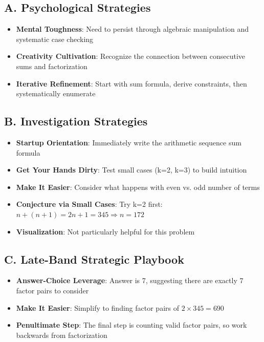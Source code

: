 \documentclass[11pt]{article}
\begin{document}
\begin{strategicbox}
\subsection*{A. Psychological Strategies}
\begin{itemize}[leftmargin=*]
    \item \textbf{Mental Toughness}: Need to persist through algebraic manipulation and systematic case checking
    \item \textbf{Creativity Cultivation}: Recognize the connection between consecutive sums and factorization
    \item \textbf{Iterative Refinement}: Start with sum formula, derive constraints, then systematically enumerate
\end{itemize}

\subsection*{B. Investigation Strategies}
\begin{itemize}[leftmargin=*]
    \item \textbf{Startup Orientation}: Immediately write the arithmetic sequence sum formula
    \item \textbf{Get Your Hands Dirty}: Test small cases (k=2, k=3) to build intuition
    \item \textbf{Make It Easier}: Consider what happens with even vs. odd number of terms
    \item \textbf{Conjecture via Small Cases}: Try k=2 first: $n + (n+1) = 2n + 1 = 345 \Rightarrow n = 172$
    \item \textbf{Visualization}: Not particularly helpful for this problem
\end{itemize}

\subsection*{C. Late-Band Strategic Playbook}
\begin{itemize}[leftmargin=*]
    \item \textbf{Answer-Choice Leverage}: Answer is 7, suggesting there are exactly 7 factor pairs to consider
    \item \textbf{Make It Easier}: Simplify to finding factor pairs of $2 \times 345 = 690$
    \item \textbf{Penultimate Step}: The final step is counting valid factor pairs, so work backwards from factorization
\end{itemize}


\end{strategicbox}
\end{document}
